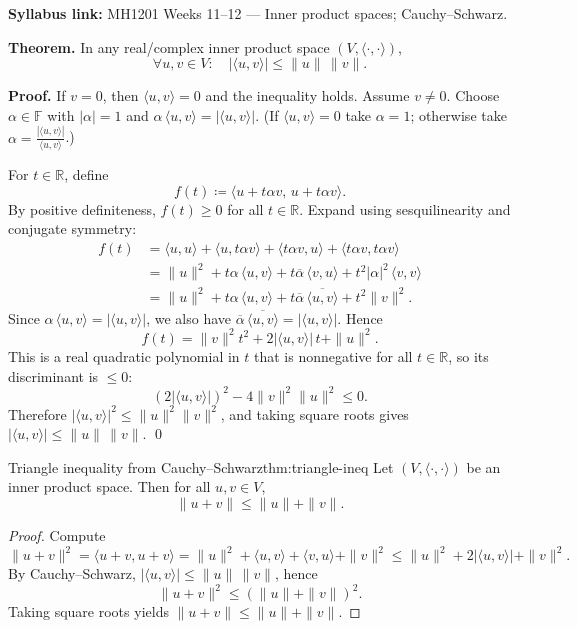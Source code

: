 \begin{extension}[title={Extension (Lecture Week 11: Cauchy--Schwarz via quadratic discriminant)}]
\textbf{Syllabus link:} MH1201 Weeks 11--12 --- Inner product spaces; Cauchy--Schwarz.

\textbf{Theorem.} In any real/complex inner product space $(V,\langle\cdot,\cdot\rangle)$,
\[
\forall u,v\in V:\quad |\langle u,v\rangle|\le \|u\|\,\|v\|.
\]

\textbf{Proof.}
If $v=0$, then $\langle u,v\rangle=0$ and the inequality holds. Assume $v\neq 0$.
Choose $\alpha\in\mathbb{F}$ with $|\alpha|=1$ and $\alpha\,\langle u,v\rangle=|\langle u,v\rangle|$.
(If $\langle u,v\rangle=0$ take $\alpha=1$; otherwise take $\alpha=\frac{|\langle u,v\rangle|}{\langle u,v\rangle}$.)

For $t\in\mathbb{R}$, define
\[
f(t)\coloneqq \langle u+t\alpha v,\,u+t\alpha v\rangle.
\]
By positive definiteness, $f(t)\ge 0$ for all $t\in\mathbb{R}$. Expand using sesquilinearity and conjugate symmetry:
\begin{align*}
f(t)
&=\langle u,u\rangle + \langle u,t\alpha v\rangle + \langle t\alpha v,u\rangle + \langle t\alpha v,t\alpha v\rangle\\
&=\|u\|^2 + t\alpha\,\langle u,v\rangle + t\overline{\alpha}\,\langle v,u\rangle + t^2|\alpha|^2\,\langle v,v\rangle\\
&=\|u\|^2 + t\alpha\,\langle u,v\rangle + t\overline{\alpha}\,\overline{\langle u,v\rangle} + t^2\|v\|^2.
\end{align*}
Since $\alpha\,\langle u,v\rangle=|\langle u,v\rangle|$, we also have
$\overline{\alpha}\,\overline{\langle u,v\rangle}=|\langle u,v\rangle|$. Hence
\[
f(t)=\|v\|^2 t^2 + 2|\langle u,v\rangle|\,t + \|u\|^2.
\]
This is a real quadratic polynomial in $t$ that is nonnegative for all $t\in\mathbb{R}$, so its discriminant is $\le 0$:
\[
(2|\langle u,v\rangle|)^2 - 4\|v\|^2\|u\|^2 \le 0.
\]
Therefore $|\langle u,v\rangle|^2\le \|u\|^2\|v\|^2$, and taking square roots gives
$|\langle u,v\rangle|\le \|u\|\,\|v\|$. \qed
\end{extension}

\begin{theorem}{Triangle inequality from Cauchy--Schwarz}{thm:triangle-ineq}
Let $(V,\langle\cdot,\cdot\rangle)$ be an inner product space. Then for all $u,v\in V$,
\[
\|u+v\|\le \|u\|+\|v\|.
\]
\end{theorem}

\begin{proof}
Compute
\[
\|u+v\|^2=\langle u+v,u+v\rangle=\|u\|^2+\langle u,v\rangle+\langle v,u\rangle+\|v\|^2
\le \|u\|^2+2|\langle u,v\rangle|+\|v\|^2.
\]
By Cauchy--Schwarz, $|\langle u,v\rangle|\le \|u\|\,\|v\|$, hence
\[
\|u+v\|^2\le (\|u\|+\|v\|)^2.
\]
Taking square roots yields $\|u+v\|\le \|u\|+\|v\|$.
\end{proof}

